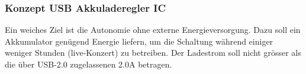 \subsubsection{Konzept USB Akkuladeregler IC}
\label{sec:Konzept_Charger}

Ein weiches Ziel ist die Autonomie ohne externe Energieversorgung. Dazu soll ein Akkumulator genügend Energie liefern, um die Schaltung während einiger weniger Stunden (live-Konzert) zu betreiben. Der Ladestrom soll nicht grösser als die über USB-2.0 zugelassenen 2.0A betragen.




